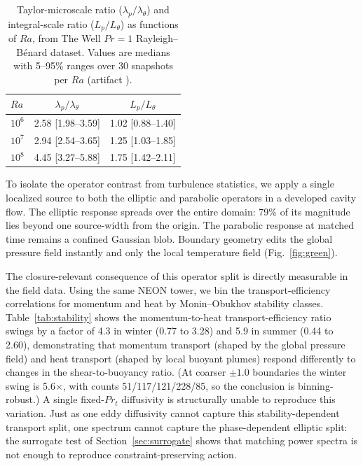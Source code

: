 \documentclass[11pt]{article}
\begin{document}
\begin{table}[t]
\centering
\caption{Taylor-microscale ratio ($\lambda_p/\lambda_\theta$) and integral-scale ratio ($L_p/L_\theta$) as functions of $Ra$, from The Well $Pr=1$ Rayleigh--B\'enard dataset. Values are medians with 5--95\% ranges over 30 snapshots per $Ra$ (artifact ).}
\label{tab:ra_sweep}
\begin{tabular}{lcc}
\toprule
$Ra$ & $\lambda_p/\lambda_\theta$ & $L_p/L_\theta$ \\
\midrule
$10^6$ & 2.58 [1.98--3.59] & 1.02 [0.88--1.40] \\
$10^7$ & 2.94 [2.54--3.65] & 1.25 [1.03--1.85] \\
$10^8$ & 4.45 [3.27--5.88] & 1.75 [1.42--2.11] \\
\bottomrule
\end{tabular}
\end{table}

To isolate the operator contrast from turbulence statistics, we apply a single localized source to both the elliptic and parabolic operators in a developed cavity flow. The elliptic response spreads over the entire domain: 79\% of its magnitude lies beyond one source-width from the origin. The parabolic response at matched time remains a confined Gaussian blob. Boundary geometry edits the global pressure field instantly and only the local temperature field (Fig.~\ref{fig:green}).

The closure-relevant consequence of this operator split is directly measurable in the field data. Using the same NEON tower, we bin the transport-efficiency correlations for momentum and heat by Monin--Obukhov stability classes. Table~\ref{tab:stability} shows the momentum-to-heat transport-efficiency ratio swings by a factor of 4.3 in winter (0.77 to 3.28) and 5.9 in summer (0.44 to 2.60), demonstrating that momentum transport (shaped by the global pressure field) and heat transport (shaped by local buoyant plumes) respond differently to changes in the shear-to-buoyancy ratio. (At coarser $\pm1.0$ boundaries the winter swing is 5.6$\times$, with counts 51/117/121/228/85, so the conclusion is binning-robust.) A single fixed-$Pr_t$ diffusivity is structurally unable to reproduce this variation. Just as one eddy diffusivity cannot capture this stability-dependent transport split, one spectrum cannot capture the phase-dependent elliptic split: the surrogate test of Section~\ref{sec:surrogate} shows that matching power spectra is not enough to reproduce constraint-preserving action.
\end{document}
